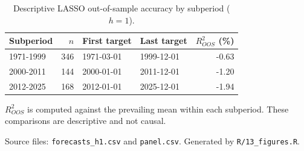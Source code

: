 \begin{table}[H]
\centering
\caption{Descriptive LASSO out-of-sample accuracy by subperiod ($h=1$).}
\label{tab:subperiods}
\normalsize
\begin{threeparttable}
\begin{tabular}{lrllr}
\toprule
Subperiod & $n$ & First target & Last target & $R^2_{OOS}$ (\%) \\
\midrule
1971-1999 & 346 & 1971-03-01 & 1999-12-01 & -0.63 \\
2000-2011 & 144 & 2000-01-01 & 2011-12-01 & -1.20 \\
2012-2025 & 168 & 2012-01-01 & 2025-12-01 & -1.94 \\
\bottomrule
\end{tabular}
\begin{tablenotes}
\normalsize
\item $R^2_{OOS}$ is computed against the prevailing mean within each subperiod. These comparisons are descriptive and not causal.
\item Source files: \texttt{forecasts\_h1.csv} and \texttt{panel.csv}. Generated by \texttt{R/13\_figures.R}.
\end{tablenotes}
\end{threeparttable}
\end{table}
